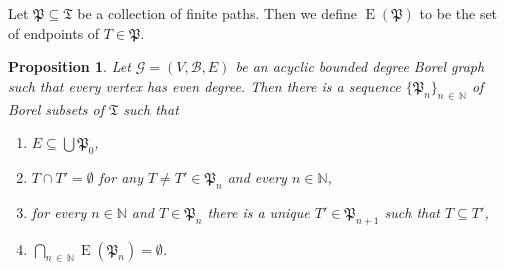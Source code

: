 \documentclass[10pt]{amsart}
\newtheorem{prop}[cdrthm]{Proposition}
\theoremstyle{definition}
\DeclareMathOperator{\E}{\mathrm{E}}
\newcommand{\clG}{\mathcal{G}}
\newcommand{\clB}{\mathcal{B}}
\newcommand{\bbZ}{\mathbb{N}}
\newcommand{\frkP}{\mathfrak{P}}
\newcommand{\frkT}{\mathfrak{T}}
\begin{document}
Let $\frkP\subseteq \frkT$ be a collection of finite paths. Then we define $\E(\frkP)$ to be the set of endpoints of $T\in \frkP$.


\begin{prop}\label{pr:paths}
Let $\clG=(V,\clB,E)$ be an acyclic bounded degree Borel graph such that every vertex has even degree. Then there is a sequence $\{\frkP_n\}_{n\,\in\,\bbZ}$ of Borel subsets of $\frkT$ such that
\begin{enumerate}
\item\label{prop4.2.1} $E\subseteq \bigcup\frkP_0$,
\item\label{prop4.2.2} $T\cap T'=\emptyset$ for any $T\not=T'\in \frkP_n$ and every $n\in \bbZ$,
\item\label{prop4.2.3} for every $n\in \bbZ$ and $T\in \frkP_n$ there is a unique $T'\in \frkP_{n+1}$ such that $T\subseteq T'$,
\item\label{prop4.2.4} $\bigcap_{n\,\in\,\bbZ} \E(\frkP_n)=\emptyset$.
\end{enumerate}
\end{prop}
\end{document}
